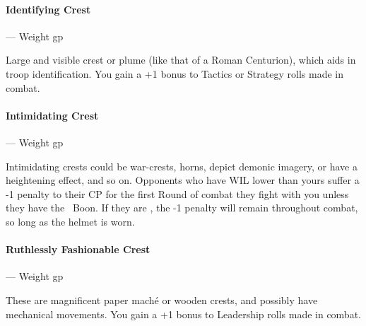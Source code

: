 \documentclass[oneside,11pt,english]{book}
\begin{document}
\vspace*{-10pt}\paragraph{Identifying Crest}--- Weight  gp\par
Large and visible crest or plume (like that of a Roman Centurion), which aids in troop identification. You gain a +1 bonus to Tactics or Strategy rolls made in combat.

\vspace*{-10pt}\paragraph{Intimidating Crest}--- Weight  gp\par
Intimidating crests could be war-crests, horns, depict demonic imagery, or have a 
heightening effect, and so on. Opponents who have WIL lower than yours suffer a -1 
penalty to their CP for the first Round of combat they fight with you unless they have 
the ~Boon. If they are , the -1 penalty will remain throughout combat, so long as the helmet is worn. 

\vspace*{-10pt}\paragraph{Ruthlessly Fashionable Crest}--- Weight  gp\par
These are magnificent paper maché or wooden crests, and possibly have mechanical 
movements. You gain a +1 bonus to Leadership rolls made in combat.
\end{document}
